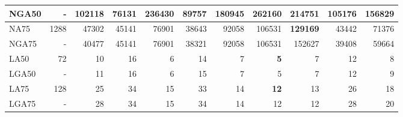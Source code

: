 \documentclass[12pt,a4paper]{article}
\begin{document}
\begin{table}[ht]
\begin{center}
\begin{tabular}{|l*{10}{|r}|}
NGA50 & - & 102118 & 76131 & 236430 & 89757 & 180945 & 262160 & 214751 & 105176 & 156829 \\ \hline
NA75 & 1288 & 47302 & 45141 & 76901 & 38643 & 92058 & 106531 & {\bf 129169} & 43442 & 71376 \\ \hline
NGA75 & - & 40477 & 45141 & 76901 & 38321 & 92058 & 106531 & 152627 & 39408 & 59664 \\ \hline
LA50 & 72 & 10 & 16 & 6 & 14 & 7 & {\bf 5} & 7 & 12 & 8 \\ \hline
LGA50 & - & 11 & 16 & 6 & 15 & 7 & 5 & 7 & 12 & 9 \\ \hline
LA75 & 128 & 25 & 34 & 15 & 33 & 14 & {\bf 12} & 13 & 26 & 18 \\ \hline
LGA75 & - & 28 & 34 & 15 & 34 & 14 & 12 & 12 & 28 & 20 \\ \hline
\end{tabular}
\end{center}
\end{table}
\end{document}
